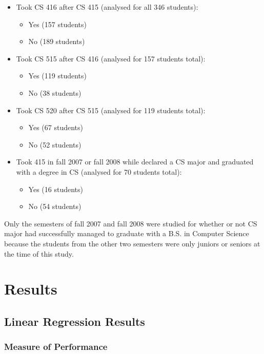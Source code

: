 \documentclass[letterpaper,11pt]{article}
\begin{document}
\begin{itemize}
\item Took CS 416 after CS 415 (analysed for all 346 students):
	\begin{itemize}
	\item Yes (157 students)
	\item No (189 students)
	\end{itemize}
\item Took CS 515 after CS 416 (analysed for 157 students total):
	\begin{itemize}
	\item Yes (119 students)
	\item No (38 students)
	\end{itemize}
\item Took CS 520 after CS 515 (analysed for 119 students total):
	\begin{itemize}
	\item Yes (67 students)
	\item No (52 students)
	\end{itemize}
\item Took 415 in fall 2007 or fall 2008 while declared a CS major and graduated with a degree in CS (analysed for 70 students total):
	\begin{itemize}
	\item Yes (16 students)
	\item No (54 students)
	\end{itemize}
\end{itemize}

Only the semesters of fall 2007 and fall 2008 were studied for whether or not CS major had successfully managed to graduate with a B.S. in Computer Science because the students from the other two semesters were only juniors or seniors at the time of this study.

\section{Results}

\subsection{Linear Regression Results}


\subsubsection{Measure of Performance}
\end{document}
